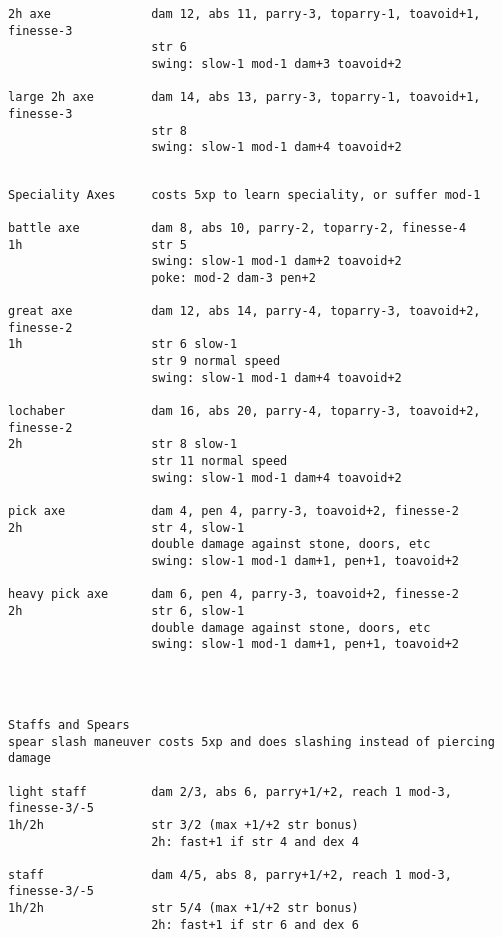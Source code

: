 \begin{verbatim}
2h axe              dam 12, abs 11, parry-3, toparry-1, toavoid+1, finesse-3
                    str 6
                    swing: slow-1 mod-1 dam+3 toavoid+2

large 2h axe        dam 14, abs 13, parry-3, toparry-1, toavoid+1, finesse-3
                    str 8
                    swing: slow-1 mod-1 dam+4 toavoid+2


\end{verbatim} \pagebreak[1] \begin{verbatim}
Speciality Axes     costs 5xp to learn speciality, or suffer mod-1

battle axe          dam 8, abs 10, parry-2, toparry-2, finesse-4
1h                  str 5
                    swing: slow-1 mod-1 dam+2 toavoid+2
                    poke: mod-2 dam-3 pen+2

great axe           dam 12, abs 14, parry-4, toparry-3, toavoid+2, finesse-2
1h                  str 6 slow-1
                    str 9 normal speed
                    swing: slow-1 mod-1 dam+4 toavoid+2

lochaber            dam 16, abs 20, parry-4, toparry-3, toavoid+2, finesse-2
2h                  str 8 slow-1
                    str 11 normal speed
                    swing: slow-1 mod-1 dam+4 toavoid+2

pick axe            dam 4, pen 4, parry-3, toavoid+2, finesse-2
2h                  str 4, slow-1
                    double damage against stone, doors, etc
                    swing: slow-1 mod-1 dam+1, pen+1, toavoid+2

heavy pick axe      dam 6, pen 4, parry-3, toavoid+2, finesse-2
2h                  str 6, slow-1
                    double damage against stone, doors, etc
                    swing: slow-1 mod-1 dam+1, pen+1, toavoid+2




\end{verbatim} \pagebreak[3] \begin{verbatim}
Staffs and Spears
spear slash maneuver costs 5xp and does slashing instead of piercing damage

light staff         dam 2/3, abs 6, parry+1/+2, reach 1 mod-3, finesse-3/-5
1h/2h               str 3/2 (max +1/+2 str bonus)
                    2h: fast+1 if str 4 and dex 4

staff               dam 4/5, abs 8, parry+1/+2, reach 1 mod-3, finesse-3/-5
1h/2h               str 5/4 (max +1/+2 str bonus)
                    2h: fast+1 if str 6 and dex 6


\end{verbatim}
